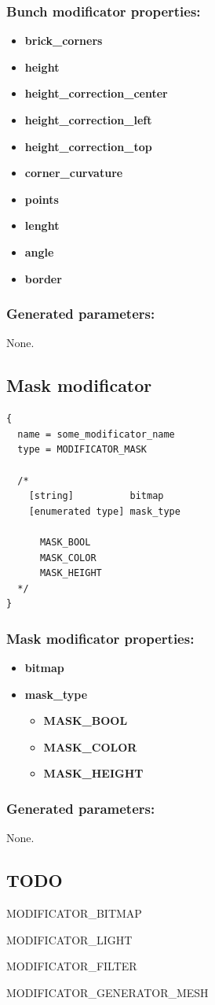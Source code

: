 \documentclass[9pt]{article}
\begin{document}
\subsubsection*{Bunch modificator properties:}
\begin{itemize}
\item{\bf brick\_corners}
\item{\bf height}
\item{\bf height\_correction\_center}
\item{\bf height\_correction\_left}
\item{\bf height\_correction\_top}
\item{\bf corner\_curvature}
\item{\bf points}
\item{\bf lenght}
\item{\bf angle}
\item{\bf border}
\end{itemize}

\subsubsection*{Generated parameters:}

None.

\subsection{Mask modificator}

\begin{verbatim}
{
  name = some_modificator_name
  type = MODIFICATOR_MASK

  /*
    [string]          bitmap
    [enumerated type] mask_type
  
      MASK_BOOL
      MASK_COLOR
      MASK_HEIGHT
  */
}
\end{verbatim}
\subsubsection*{Mask modificator properties:}
\begin{itemize}
\item{\bf bitmap}
\item{\bf mask\_type}
\begin{itemize}
\item{\bf MASK\_BOOL}
\item{\bf MASK\_COLOR}
\item{\bf MASK\_HEIGHT}
\end{itemize}
\end{itemize}

\subsubsection*{Generated parameters:}

None.

\subsection{TODO}

MODIFICATOR\_BITMAP

MODIFICATOR\_LIGHT

MODIFICATOR\_FILTER

MODIFICATOR\_GENERATOR\_MESH
\end{document}
